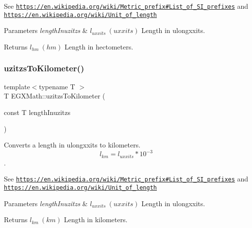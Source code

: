 See \href{https://en.wikipedia.org/wiki/Metric_prefix#List_of_SI_prefixes}{\tt https\+://en.\+wikipedia.\+org/wiki/\+Metric\+\_\+prefix\#\+List\+\_\+of\+\_\+\+S\+I\+\_\+prefixes} and \href{https://en.wikipedia.org/wiki/Unit_of_length}{\tt https\+://en.\+wikipedia.\+org/wiki/\+Unit\+\_\+of\+\_\+length} 
\begin{DoxyParams}{Parameters}
{\em length\+Inuzitzs} & $ l_{uxxits}\ (uxxits)$ Length in ulongxxits. \\
\hline
\end{DoxyParams}
\begin{DoxyReturn}{Returns}
$ l_{hm}\ (hm)$ Length in hectometers. 
\end{DoxyReturn}
\mbox{\label{group___e_g_x_math-_conversions-_length_conversions-_non-_s_i-uzitzs-_s_i_ga43a39eb66f3250c955de8fb2beff314c}} 
\subsubsection{\texorpdfstring{uzitzs\+To\+Kilometer()}{uzitzsToKilometer()}}
{\footnotesize\ttfamily template$<$typename T $>$ \\
T E\+G\+X\+Math\+::uzitzs\+To\+Kilometer (\begin{DoxyParamCaption}\item[{const T}]{length\+Inuzitzs }\end{DoxyParamCaption})}



Converts a length in ulongxxits to kilometers. \[ l_{km}=l_{uxxits} * 10^{-3} \]. 

See \href{https://en.wikipedia.org/wiki/Metric_prefix#List_of_SI_prefixes}{\tt https\+://en.\+wikipedia.\+org/wiki/\+Metric\+\_\+prefix\#\+List\+\_\+of\+\_\+\+S\+I\+\_\+prefixes} and \href{https://en.wikipedia.org/wiki/Unit_of_length}{\tt https\+://en.\+wikipedia.\+org/wiki/\+Unit\+\_\+of\+\_\+length} 
\begin{DoxyParams}{Parameters}
{\em length\+Inuzitzs} & $ l_{uxxits}\ (uxxits)$ Length in ulongxxits. \\
\hline
\end{DoxyParams}
\begin{DoxyReturn}{Returns}
$ l_{km}\ (km)$ Length in kilometers. 
\end{DoxyReturn}
\mbox{\label{group___e_g_x_math-_conversions-_length_conversions-_non-_s_i-uzitzs-_s_i_ga237ffeef9137de3dd2cf5ae0eacf973e}} 
